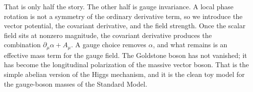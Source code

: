 That is only half the story. The other half is gauge invariance. A local phase rotation is not a symmetry of the ordinary derivative term, so we introduce the vector potential, the covariant derivative, and the field strength. Once the scalar field sits at nonzero magnitude, the covariant derivative produces the combination \(\partial_\mu\alpha + A_\mu\). A gauge choice removes \(\alpha\), and what remains is an effective mass term for the gauge field. The Goldstone boson has not vanished; it has become the longitudinal polarization of the massive vector boson. That is the simple abelian version of the Higgs mechanism, and it is the clean toy model for the gauge-boson masses of the Standard Model.